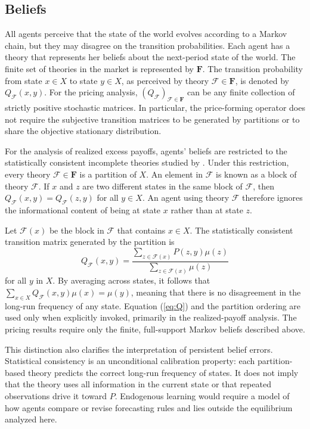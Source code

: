 \documentclass[11pt]{article}
\theoremstyle{plain}
\begin{document}
\subsection{Beliefs}

All agents perceive that the state of the world evolves according to a Markov chain, but they may disagree on the transition probabilities. Each agent has a theory that represents her beliefs about the next-period state of the world. The finite set of theories in the market is represented by $\mathbf{F}$. The transition probability from state $x\in X$ to state $y\in X$, as perceived by theory $\mathcal{F}\in\mathbf{F}$, is denoted by $Q_\mathcal{F}(x,y)$. For the pricing analysis, $(Q_\mathcal{F})_{\mathcal{F}\in\mathbf{F}}$ can be any finite collection of strictly positive stochastic matrices. In particular, the price-forming operator does not require the subjective transition matrices to be generated by partitions or to share the objective stationary distribution.

For the analysis of realized excess payoffs, agents' beliefs are restricted to the statistically consistent incomplete theories studied by \cite{EysterPiccione2014}. Under this restriction, every theory $\mathcal{F}\in\mathbf{F}$ is a partition of $X$. An element in $\mathcal{F}$ is known as a block of theory $\mathcal{F}$. If $x$ and $z$ are two different states in the same block of $\mathcal{F}$, then $Q_\mathcal{F}(x,y)=Q_\mathcal{F}(z,y)$ for all $y\in X$. An agent using theory $\mathcal{F}$ therefore ignores the informational content of being at state $x$ rather than at state $z$.

Let $\mathcal{F}(x)$ be the block in $\mathcal{F}$ that contains $x\in X$. The statistically consistent transition matrix generated by the partition is
\begin{equation} \label{eq:Q}
Q_{\mathcal{F}}\left(x,y\right)=\frac{\sum_{z\in \mathcal{F}\left(x\right)}P(z,y)\mu\left(z\right)}{\sum_{z\in \mathcal{F}\left(x\right)}\mu\left(z\right)}
\end{equation}
for all $y$ in $X$. By averaging across states, it follows that
\(\sum_{x\in X}Q_{\mathcal{F}}\left(x,y\right)\mu(x)=\mu(y)\),
meaning that there is no disagreement in the long-run frequency of any state. Equation (\ref{eq:Q}) and the partition ordering are used only when explicitly invoked, primarily in the realized-payoff analysis. The pricing results require only the finite, full-support Markov beliefs described above.

This distinction also clarifies the interpretation of persistent belief errors. Statistical consistency is an unconditional calibration property: each partition-based theory predicts the correct long-run frequency of states. It does not imply that the theory uses all information in the current state or that repeated observations drive it toward $P$. Endogenous learning would require a model of how agents compare or revise forecasting rules and lies outside the equilibrium analyzed here.
\end{document}
